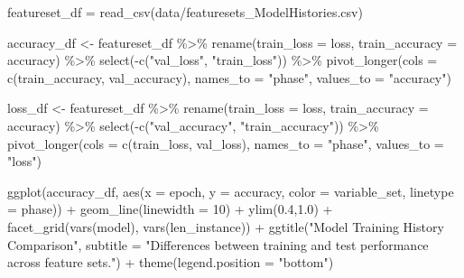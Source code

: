 \documentclass[
]{book}
\newenvironment{Shaded}{\begin{snugshade}}{\end{snugshade}}
\newcommand{\AttributeTok}[1]{\textcolor[rgb]{0.77,0.63,0.00}{#1}}
\newcommand{\DecValTok}[1]{\textcolor[rgb]{0.00,0.00,0.81}{#1}}
\newcommand{\FloatTok}[1]{\textcolor[rgb]{0.00,0.00,0.81}{#1}}
\newcommand{\FunctionTok}[1]{\textcolor[rgb]{0.00,0.00,0.00}{#1}}
\newcommand{\NormalTok}[1]{#1}
\newcommand{\OtherTok}[1]{\textcolor[rgb]{0.56,0.35,0.01}{#1}}
\newcommand{\SpecialCharTok}[1]{\textcolor[rgb]{0.00,0.00,0.00}{#1}}
\newcommand{\StringTok}[1]{\textcolor[rgb]{0.31,0.60,0.02}{#1}}
\begin{document}
\begin{Shaded}
\begin{Highlighting}[]
\NormalTok{featureset\_df }\OtherTok{=} \FunctionTok{read\_csv}\NormalTok{(}\StringTok{\textquotesingle{}data/featuresets\_ModelHistories.csv\textquotesingle{}}\NormalTok{)}

\NormalTok{accuracy\_df }\OtherTok{\textless{}{-}}\NormalTok{ featureset\_df }\SpecialCharTok{\%\textgreater{}\%}
  \FunctionTok{rename}\NormalTok{(}\AttributeTok{train\_loss =}\NormalTok{ loss, }\AttributeTok{train\_accuracy =}\NormalTok{ accuracy) }\SpecialCharTok{\%\textgreater{}\%}
  \FunctionTok{select}\NormalTok{(}\SpecialCharTok{{-}}\FunctionTok{c}\NormalTok{(}\StringTok{"val\_loss"}\NormalTok{, }\StringTok{"train\_loss"}\NormalTok{)) }\SpecialCharTok{\%\textgreater{}\%}
  \FunctionTok{pivot\_longer}\NormalTok{(}\AttributeTok{cols =} \FunctionTok{c}\NormalTok{(train\_accuracy, val\_accuracy), }\AttributeTok{names\_to =} \StringTok{"phase"}\NormalTok{, }\AttributeTok{values\_to =} \StringTok{"accuracy"}\NormalTok{)}

\NormalTok{loss\_df }\OtherTok{\textless{}{-}}\NormalTok{ featureset\_df }\SpecialCharTok{\%\textgreater{}\%}
  \FunctionTok{rename}\NormalTok{(}\AttributeTok{train\_loss =}\NormalTok{ loss, }\AttributeTok{train\_accuracy =}\NormalTok{ accuracy) }\SpecialCharTok{\%\textgreater{}\%}
  \FunctionTok{select}\NormalTok{(}\SpecialCharTok{{-}}\FunctionTok{c}\NormalTok{(}\StringTok{"val\_accuracy"}\NormalTok{, }\StringTok{"train\_accuracy"}\NormalTok{)) }\SpecialCharTok{\%\textgreater{}\%}
  \FunctionTok{pivot\_longer}\NormalTok{(}\AttributeTok{cols =} \FunctionTok{c}\NormalTok{(train\_loss, val\_loss), }\AttributeTok{names\_to =} \StringTok{"phase"}\NormalTok{, }\AttributeTok{values\_to =} \StringTok{"loss"}\NormalTok{)}
\end{Highlighting}
\end{Shaded}

\begin{Shaded}
\begin{Highlighting}[]
\FunctionTok{ggplot}\NormalTok{(accuracy\_df, }\FunctionTok{aes}\NormalTok{(}\AttributeTok{x =}\NormalTok{ epoch, }\AttributeTok{y =}\NormalTok{ accuracy, }\AttributeTok{color =}\NormalTok{ variable\_set, }\AttributeTok{linetype =}\NormalTok{ phase)) }\SpecialCharTok{+} 
  \FunctionTok{geom\_line}\NormalTok{(}\AttributeTok{linewidth =} \DecValTok{10}\NormalTok{) }\SpecialCharTok{+} 
  \FunctionTok{ylim}\NormalTok{(}\FloatTok{0.4}\NormalTok{,}\FloatTok{1.0}\NormalTok{) }\SpecialCharTok{+}
  \FunctionTok{facet\_grid}\NormalTok{(}\FunctionTok{vars}\NormalTok{(model), }\FunctionTok{vars}\NormalTok{(len\_instance)) }\SpecialCharTok{+}
  \FunctionTok{ggtitle}\NormalTok{(}\StringTok{"Model Training History Comparison"}\NormalTok{, }\AttributeTok{subtitle =} \StringTok{"Differences between training and test performance across feature sets."}\NormalTok{) }\SpecialCharTok{+} \FunctionTok{theme}\NormalTok{(}\AttributeTok{legend.position =} \StringTok{"bottom"}\NormalTok{)}
\end{Highlighting}
\end{Shaded}
\end{document}
